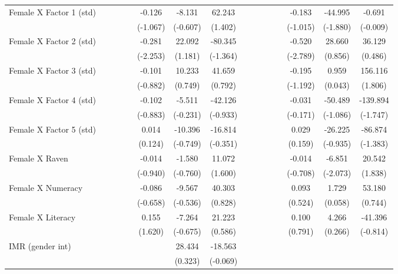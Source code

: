{\begin{longtable}{@{\extracolsep{\fill}}lccccccccccccccc}
    Female X Factor 1 (std) &   &   &   &   & -0.126 & -8.131 & 62.243 &   &   &   &   &   & -0.183 & -44.995 & -0.691 \\
      &   &   &   &   & (-1.067) & (-0.607) & (1.402) &   &   &   &   &   & (-1.015) & (-1.880) & (-0.009) \\
    Female X Factor 2 (std) &   &   &   &   & -0.281 & 22.092 & -80.345 &   &   &   &   &   & -0.520 & 28.660 & 36.129 \\
      &   &   &   &   & (-2.253) & (1.181) & (-1.364) &   &   &   &   &   & (-2.789) & (0.856) & (0.486) \\
    Female X Factor 3 (std) &   &   &   &   & -0.101 & 10.233 & 41.659 &   &   &   &   &   & -0.195 & 0.959 & 156.116 \\
      &   &   &   &   & (-0.882) & (0.749) & (0.792) &   &   &   &   &   & (-1.192) & (0.043) & (1.806) \\
    Female X Factor 4 (std) &   &   &   &   & -0.102 & -5.511 & -42.126 &   &   &   &   &   & -0.031 & -50.489 & -139.894 \\
      &   &   &   &   & (-0.883) & (-0.231) & (-0.933) &   &   &   &   &   & (-0.171) & (-1.086) & (-1.747) \\
    Female X Factor 5 (std) &   &   &   &   & 0.014 & -10.396 & -16.814 &   &   &   &   &   & 0.029 & -26.225 & -86.874 \\
      &   &   &   &   & (0.124) & (-0.749) & (-0.351) &   &   &   &   &   & (0.159) & (-0.935) & (-1.383) \\
    Female X Raven &   &   &   &   & -0.014 & -1.580 & 11.072 &   &   &   &   &   & -0.014 & -6.851 & 20.542 \\
      &   &   &   &   & (-0.940) & (-0.760) & (1.600) &   &   &   &   &   & (-0.708) & (-2.073) & (1.838) \\
    Female X Numeracy &   &   &   &   & -0.086 & -9.567 & 40.303 &   &   &   &   &   & 0.093 & 1.729 & 53.180 \\
      &   &   &   &   & (-0.658) & (-0.536) & (0.828) &   &   &   &   &   & (0.524) & (0.058) & (0.744) \\
    Female X Literacy &   &   &   &   & 0.155 & -7.264 & 21.223 &   &   &   &   &   & 0.100 & 4.266 & -41.396 \\
      &   &   &   &   & (1.620) & (-0.675) & (0.586) &   &   &   &   &   & (0.791) & (0.266) & (-0.814) \\
    IMR (gender int) &   &   &   &   &   & 28.434 & -18.563 &   &   &   &   &   &   &   &  \\
      &   &   &   &   &   & (0.323) & (-0.069) &   &   &   &   &   &   &   &  \\

\end{longtable}}
